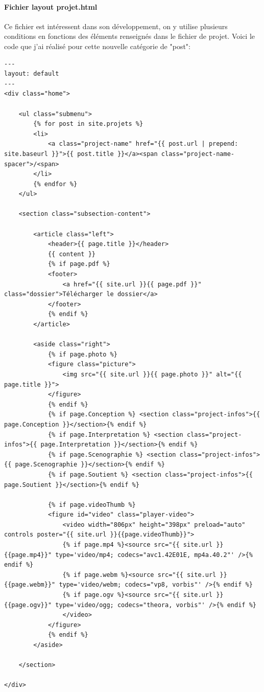 \documentclass[11pt,a4paper,twoside]{report}
\begin{document}
			\paragraph{Fichier layout projet.html}Ce fichier est intéressent dans son développement, on y utilise plusieurs conditions en fonctions des éléments renseignés dans le fichier de projet. Voici le code que j'ai réalisé pour cette nouvelle catégorie de "post":
				\lstset{caption=Fichier "projet.html"}
				\begin{lstlisting}
---
layout: default
---
<div class="home">

	<ul class="submenu">
 		{% for post in site.projets %}
		<li>
			<a class="project-name" href="{{ post.url | prepend: site.baseurl }}">{{ post.title }}</a><span class="project-name-spacer">/<span>
		</li>
		{% endfor %}
	</ul>
	
	<section class="subsection-content">
	
		<article class="left">
			<header>{{ page.title }}</header>
			{{ content }}
			{% if page.pdf %}
			<footer>
				<a href="{{ site.url }}{{ page.pdf }}" class="dossier">Télécharger le dossier</a>
			</footer>
			{% endif %}
		</article>
		
		<aside class="right">
			{% if page.photo %}
			<figure class="picture">
				<img src="{{ site.url }}{{ page.photo }}" alt="{{ page.title }}">
			</figure>
			{% endif %}
			{% if page.Conception %} <section class="project-infos">{{ page.Conception }}</section>{% endif %}
			{% if page.Interpretation %} <section class="project-infos">{{ page.Interpretation }}</section>{% endif %}
			{% if page.Scenographie %} <section class="project-infos">{{ page.Scenographie }}</section>{% endif %}
			{% if page.Soutient %} <section class="project-infos">{{ page.Soutient }}</section>{% endif %}
			
			{% if page.videoThumb %}
			<figure id="video" class="player-video">
				<video width="806px" height="398px" preload="auto" controls poster="{{ site.url }}{{page.videoThumb}}">
				{% if page.mp4 %}<source src="{{ site.url }}{{page.mp4}}" type='video/mp4; codecs="avc1.42E01E, mp4a.40.2"' />{% endif %}
				{% if page.webm %}<source src="{{ site.url }}{{page.webm}}" type='video/webm; codecs="vp8, vorbis"' />{% endif %}
				{% if page.ogv %}<source src="{{ site.url }}{{page.ogv}}" type='video/ogg; codecs="theora, vorbis"' />{% endif %}
				</video>
			</figure>
			{% endif %}
		</aside>
	
	</section>
	
</div>

				\end{lstlisting}
\end{document}
